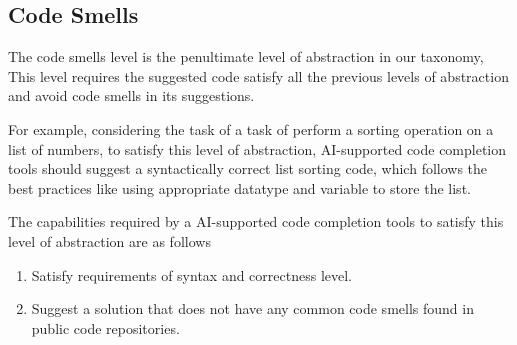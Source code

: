 \subsection{Code Smells}
The code smells level is the penultimate level of abstraction in our taxonomy, This level requires the suggested code satisfy all the previous levels of abstraction and avoid code smells in its suggestions.

For example, considering the task of  a task of perform a sorting operation on a list of numbers, to satisfy this level of abstraction, AI-supported code completion tools should
suggest a syntactically correct list sorting code, which follows the best practices like using appropriate datatype and variable to store the list.

The capabilities required by a AI-supported code completion tools to satisfy this
level of abstraction are as follows
\begin{enumerate}
    \item Satisfy requirements of syntax and correctness level.
    \item Suggest a solution that does not have any common code smells found in public code repositories.
\end{enumerate}